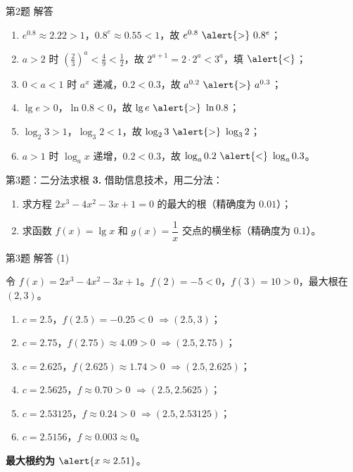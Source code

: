 \documentclass[10pt,aspectratio=169,serif]{beamer}
\begin{document}
\begin{frame}[t]{第2题 解答}
\begin{tcolorbox}[colback=orange!10,colframe=orange,title=\textbf{解}]
\begin{enumerate}[(1)]
  \item $e^{0.8}\approx 2.22>1$，$0.8^{e}\approx 0.55<1$，故 $e^{0.8}\ \alert{>}\ 0.8^{e}$；
  \item $a>2$ 时 $\left(\tfrac{2}{3}\right)^{a}<\tfrac{4}{9}<\tfrac12$，故 $2^{a+1}=2\cdot 2^{a}<3^{a}$，填 $\alert{<}$；
  \item $0<a<1$ 时 $a^{x}$ 递减，$0.2<0.3$，故 $a^{0.2}\ \alert{>}\ a^{0.3}$；
  \item $\lg e>0$，$\ln 0.8<0$，故 $\lg e\ \alert{>}\ \ln 0.8$；
  \item $\log_{2}3>1$，$\log_{3}2<1$，故 $\log_{2}3\ \alert{>}\ \log_{3}2$；
  \item $a>1$ 时 $\log_{a}x$ 递增，$0.2<0.3$，故 $\log_{a}0.2\ \alert{<}\ \log_{a}0.3$。
\end{enumerate}
\end{tcolorbox}
\end{frame}

\begin{frame}[t]{第3题：二分法求根}
\textbf{3.} 借助信息技术，用二分法：
\begin{enumerate}[(1)]
  \item 求方程 $2x^{3}-4x^{2}-3x+1=0$ 的最大的根（精确度为 $0.01$）；
  \item 求函数 $f(x)=\lg x$ 和 $g(x)=\dfrac{1}{x}$ 交点的横坐标（精确度为 $0.1$）。
\end{enumerate}
\end{frame}

\begin{frame}[t]{第3题 解答 (1)}
\begin{tcolorbox}[colback=orange!10,colframe=orange,title=\textbf{解 (1)}]
令 $f(x)=2x^{3}-4x^{2}-3x+1$。$f(2)=-5<0$，$f(3)=10>0$，最大根在 $(2,3)$。
\smallskip
\begin{enumerate}
  \item $c=2.5$，$f(2.5)=-0.25<0$ $\Rightarrow (2.5,3)$；
  \item $c=2.75$，$f(2.75)\approx 4.09>0$ $\Rightarrow (2.5,2.75)$；
  \item $c=2.625$，$f(2.625)\approx 1.74>0$ $\Rightarrow (2.5,2.625)$；
  \item $c=2.5625$，$f\approx 0.70>0$ $\Rightarrow (2.5,2.5625)$；
  \item $c=2.53125$，$f\approx 0.24>0$ $\Rightarrow (2.5,2.53125)$；
  \item $c=2.5156$，$f\approx 0.003\approx 0$。
\end{enumerate}
\textbf{最大根约为 } $\alert{x\approx 2.51}$。
\end{tcolorbox}
\end{frame}
\end{document}
